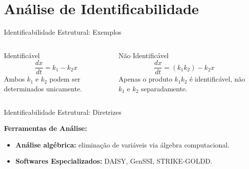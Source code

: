 \section{Análise de Identificabilidade}

\begin{frame}{Identificabilidade Estrutural: Exemplos}

\begin{columns}
\begin{block}{Identificável}
\begin{equation*}
\frac{dx}{dt} = k_1 - k_2 x
\end{equation*}
Ambos $k_1$ e $k_2$ podem ser determinados unicamente.
\end{block}

\begin{alertblock}{Não Identificável}
\begin{equation*}
\frac{dx}{dt} = (k_1 k_2) - k_2 x
\end{equation*}
Apenas o produto $k_1 k_2$ é identificável, não $k_1$ e $k_2$ separadamente.
\end{alertblock}
\end{columns}
\end{frame}

\begin{frame}{Identificabilidade Estrutural: Diretrizes}

\vspace{0.5cm}

\textbf{Ferramentas de Análise:}
\begin{itemize}
    \item \textbf{Análise algébrica:} eliminação de variáveis via álgebra computacional.
    \item \textbf{Softwares Especializados:} DAISY, GenSSI, STRIKE-GOLDD.
\end{itemize}
\end{frame}

